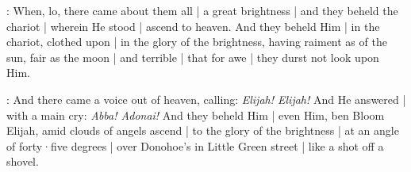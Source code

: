 :
When,
lo,
there came about them all |
a great brightness |
and they beheld the chariot |
wherein He stood |
ascend to heaven.
And they beheld Him |
in the chariot,
clothed upon |
in the glory of the brightness,
having raiment as of the sun,
fair as the moon |
and terrible |
that for awe |
they durst not look upon Him.

:
And there came a voice out of heaven,
calling:
\emph{Elijah!
Elijah!}
And He answered |
with a main cry:
\emph{Abba!
Adonai!}
And they beheld Him |
even Him,
ben Bloom Elijah,
amid clouds of angels ascend |
to the glory of the brightness |
at an angle of forty·five degrees |
over Donohoe's in Little Green street |
like a shot off a shovel.
